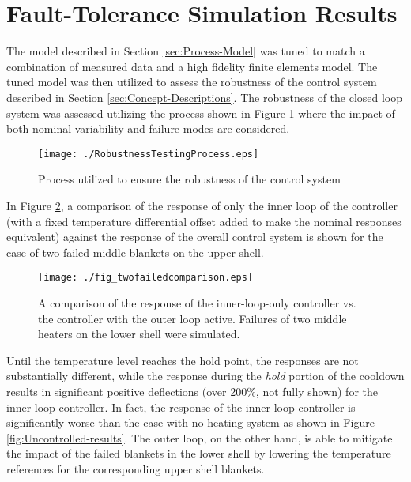 \documentclass[a4paper, 10pt, conference]{ieeeconf}      %
\begin{document}
\section{Fault-Tolerance Simulation Results\label{sec:Fault-Tolerance-Simulation-Resul}}
The model described in Section \ref{sec:Process-Model} was tuned to match a combination of measured data and a high fidelity finite elements model. The tuned model was then utilized to assess the robustness of the control system described in Section \ref{sec:Concept-Descriptions}. The robustness of the closed loop system was assessed utilizing the process shown in Figure \ref{fig:Robustness-testing-process} where the impact of both nominal variability and failure modes are considered.
\begin{figure}
\texttt{[image: ./RobustnessTestingProcess.eps]}
\caption{\label{fig:Robustness-testing-process} Process utilized to ensure the robustness of the control system}
\end{figure}


In Figure \ref{fig:Two-failed}, a comparison of the response of only the inner loop of the controller (with a fixed temperature differential offset added to make the nominal responses equivalent) against the response of the overall control system is shown for the case of two failed middle blankets on the upper shell. 
\begin{figure}
\centering{}\texttt{[image: ./fig\_twofailedcomparison.eps]}
\caption{\label{fig:Two-failed} A comparison of the response of the inner-loop-only controller vs. the controller with the outer loop active. Failures of two middle heaters on the lower shell were simulated.}
\end{figure} 
Until the temperature level reaches the hold point, the responses are not substantially different, while the response during the \emph{hold} portion of the cooldown results in significant positive deflections (over 200\%, not fully shown) for the inner loop controller. In fact, the response of the inner loop controller is significantly worse than the case with no heating system as shown in Figure \ref{fig:Uncontrolled-results}. The outer loop, on the other hand, is able to mitigate the impact of the failed blankets in the lower shell by lowering the temperature references for the corresponding upper shell blankets.
\end{document}
